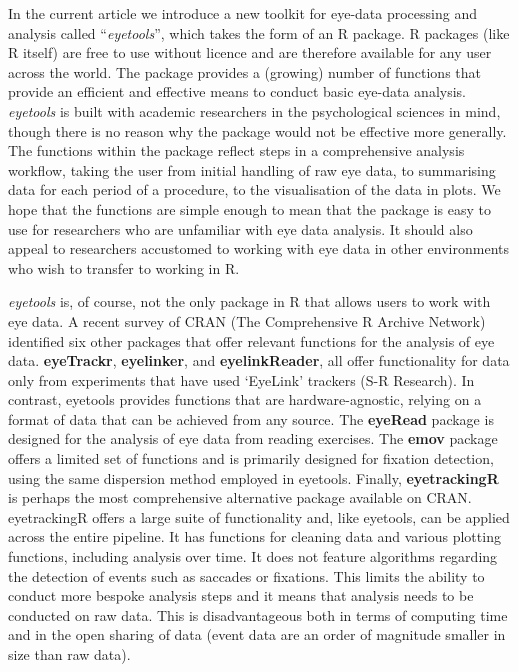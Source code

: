 \documentclass[
  man,
  floatsintext,
  longtable,
  nolmodern,
  notxfonts,
  notimes,
  colorlinks=true,linkcolor=blue,citecolor=blue,urlcolor=blue]{apa7}
\begin{document}
In the current article we introduce a new toolkit for eye-data
processing and analysis called ``\emph{eyetools}'', which takes the form
of an R package. R packages (like R itself) are free to use without
licence and are therefore available for any user across the world. The
package provides a (growing) number of functions that provide an
efficient and effective means to conduct basic eye-data analysis.
\emph{eyetools} is built with academic researchers in the psychological
sciences in mind, though there is no reason why the package would not be
effective more generally. The functions within the package reflect steps
in a comprehensive analysis workflow, taking the user from initial
handling of raw eye data, to summarising data for each period of a
procedure, to the visualisation of the data in plots. We hope that the
functions are simple enough to mean that the package is easy to use for
researchers who are unfamiliar with eye data analysis. It should also
appeal to researchers accustomed to working with eye data in other
environments who wish to transfer to working in R.

\emph{eyetools} is, of course, not the only package in R that allows
users to work with eye data. A recent survey of CRAN (The Comprehensive
R Archive Network) identified six other packages that offer relevant
functions for the analysis of eye data. \textbf{eyeTrackr},
\textbf{eyelinker}, and \textbf{eyelinkReader}, all offer functionality
for data only from experiments that have used `EyeLink' trackers (S-R
Research). In contrast, eyetools provides functions that are
hardware-agnostic, relying on a format of data that can be achieved from
any source. The \textbf{eyeRead} package is designed for the analysis of
eye data from reading exercises. The \textbf{emov} package offers a
limited set of functions and is primarily designed for fixation
detection, using the same dispersion method employed in eyetools.
Finally, \textbf{eyetrackingR} is perhaps the most comprehensive
alternative package available on CRAN. eyetrackingR offers a large suite
of functionality and, like eyetools, can be applied across the entire
pipeline. It has functions for cleaning data and various plotting
functions, including analysis over time. It does not feature algorithms
regarding the detection of events such as saccades or fixations. This
limits the ability to conduct more bespoke analysis steps and it means
that analysis needs to be conducted on raw data. This is disadvantageous
both in terms of computing time and in the open sharing of data (event
data are an order of magnitude smaller in size than raw data).
\end{document}
